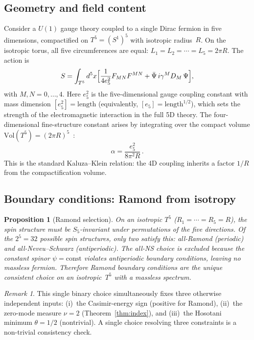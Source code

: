 \documentclass[11pt,a4paper]{article}
\newtheorem{proposition}[theorem]{Proposition}
\theoremstyle{definition}
\theoremstyle{remark}
\newtheorem{remark}[theorem]{Remark}
\begin{document}
\subsection{Geometry and field content}

Consider a $U(1)$ gauge theory coupled to a single Dirac fermion in five
dimensions, compactified on $T^5=(S^1)^5$ with isotropic radius~$R$.
On the isotropic torus, all five circumferences are equal:
$L_1=L_2=\cdots=L_5 = 2\pi R$.
The action is~\cite{AppelquistChodosFreund1987}
\begin{equation}\label{eq:5daction}
  S = \int_{T^5}d^5x\Bigl[\frac{1}{4e_5^2}F_{MN}F^{MN}
      + \bar\Psi\,i\gamma^M D_M\,\Psi\Bigr],
\end{equation}
with $M,N=0,\ldots,4$.  Here $e_5^2$ is the five-dimensional gauge
coupling constant with mass dimension $[e_5^2]=\text{length}$
(equivalently, $[e_5]=\text{length}^{1/2}$), which sets the strength
of the electromagnetic interaction in the full 5D theory.
The four-dimensional fine-structure constant arises by integrating
over the compact volume
$\mathrm{Vol}(T^5)=(2\pi R)^5$~\cite{AppelquistChodosFreund1987}:
\begin{equation}\label{eq:alpha5d}
  \alpha = \frac{e_5^2}{8\pi^2 R}\,.
\end{equation}
This is the standard Kaluza--Klein relation: the 4D coupling inherits
a factor $1/R$ from the compactification volume.

\subsection{Boundary conditions: Ramond from isotropy}

\begin{proposition}[Ramond selection]\label{prop:ramond}
On an isotropic $T^5$ ($R_1=\cdots=R_5=R$), the spin structure must be
$S_5$-invariant under permutations of the five directions.  Of the
$2^5=32$ possible spin structures, only two satisfy this: all-Ramond
(periodic) and all-Neveu--Schwarz (antiperiodic).  The all-NS choice is
excluded because the constant spinor $\psi=\mathrm{const}$ violates
antiperiodic boundary conditions, leaving no massless fermion.
Therefore Ramond boundary conditions are the unique consistent choice on
an isotropic~$T^5$ with a massless spectrum.
\end{proposition}

\begin{remark}
This single binary choice simultaneously fixes three otherwise
independent inputs: (i)~the Casimir-energy sign (positive for Ramond),
(ii)~the zero-mode measure $\nu=2$ (Theorem~\ref{thm:index}), and
(iii)~the Hosotani minimum $\theta=1/2$ (nontrivial).  A single choice
resolving three constraints is a non-trivial consistency check.
\end{remark}
\end{document}
